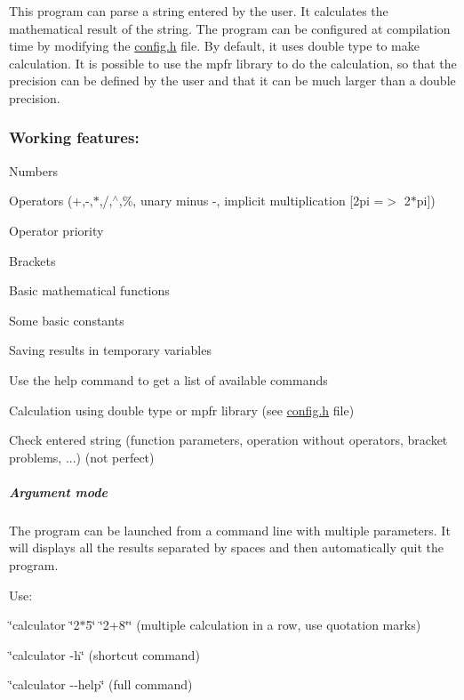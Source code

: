 This program can parse a string entered by the user. It calculates the mathematical result of the string. The program can be configured at compilation time by modifying the \hyperlink{config_8h}{config.\+h} file. By default, it uses double type to make calculation. It is possible to use the mpfr library to do the calculation, so that the precision can be defined by the user and that it can be much larger than a double precision.

\subsubsection*{Working features\+:}


\begin{DoxyItemize}
\item Numbers
\item Operators (+,-\/,$\ast$,/,$^\wedge$,\%, unary minus -\/, implicit multiplication \mbox{[}2pi =$>$ 2$\ast$pi\mbox{]})
\item Operator priority
\item Brackets
\item Basic mathematical functions
\item Some basic constants
\item Saving results in temporary variables
\item Use the help command to get a list of available commands
\item Calculation using double type or mpfr library (see \hyperlink{config_8h}{config.\+h} file)
\item Check entered string (function parameters, operation without operators, bracket problems, ...) (not perfect)
\end{DoxyItemize}

\subparagraph*{Argument mode}

The program can be launched from a command line with multiple parameters. It will displays all the results separated by spaces and then automatically quit the program.
\begin{DoxyItemize}
\item Use\+:
\begin{DoxyItemize}
\item \char`\"{}calculator \char`\"{}2$\ast$5\char`\"{} \char`\"{}2+8\char`\"{}\char`\"{} (multiple calculation in a row, use quotation marks)
\item \char`\"{}calculator -\/h\char`\"{} (shortcut command)
\item \char`\"{}calculator -\/-\/help\char`\"{} (full command)
\end{DoxyItemize}
\end{DoxyItemize}


